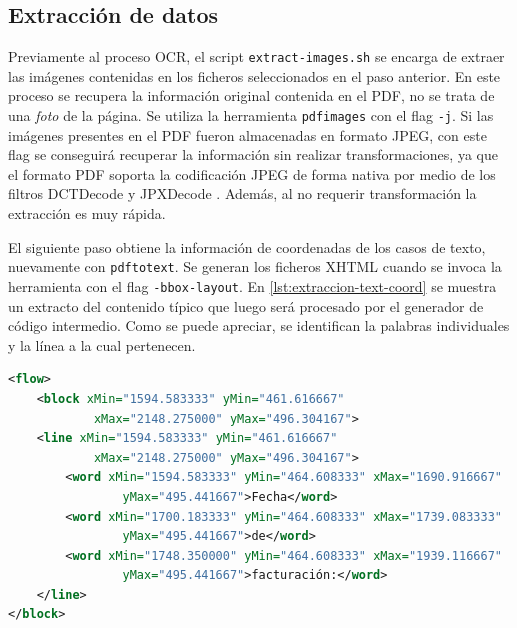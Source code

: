 \subsection{Extracción de datos}

Previamente al proceso OCR, el script \verb|extract-images.sh| se encarga de extraer las imágenes contenidas en los ficheros seleccionados en el paso anterior. En este proceso se recupera la información original contenida en el PDF, no se trata de una \emph{foto} de la página. Se utiliza la herramienta \verb|pdfimages| con el flag \verb|-j|. Si las imágenes presentes en el PDF fueron almacenadas en formato JPEG, con este flag se conseguirá recuperar la información sin realizar transformaciones, ya que el formato PDF soporta la codificación JPEG de forma nativa por medio de los filtros DCTDecode y JPXDecode \cite[23]{adobe_book_iso32000-1}. Además, al no requerir transformación la extracción es muy rápida.

El siguiente paso obtiene la información de coordenadas de los casos de texto, nuevamente con \verb|pdftotext|. Se generan los ficheros XHTML cuando se invoca la herramienta con el flag \verb|-bbox-layout|. En \ref{lst:extraccion-text-coord} se muestra un extracto del contenido típico que luego será procesado por el generador de código intermedio. Como se puede apreciar, se identifican la palabras individuales y la línea a la cual pertenecen.

\begin{lstlisting}[language=XML,caption={Extracción de texto con información de coordenadas},label=lst:extraccion-text-coord]
<flow>
    <block xMin="1594.583333" yMin="461.616667" 
            xMax="2148.275000" yMax="496.304167">
    <line xMin="1594.583333" yMin="461.616667" 
            xMax="2148.275000" yMax="496.304167">
        <word xMin="1594.583333" yMin="464.608333" xMax="1690.916667" 
                yMax="495.441667">Fecha</word>
        <word xMin="1700.183333" yMin="464.608333" xMax="1739.083333"   
                yMax="495.441667">de</word>
        <word xMin="1748.350000" yMin="464.608333" xMax="1939.116667" 
                yMax="495.441667">facturación:</word>
    </line>
</block>
\end{lstlisting}

